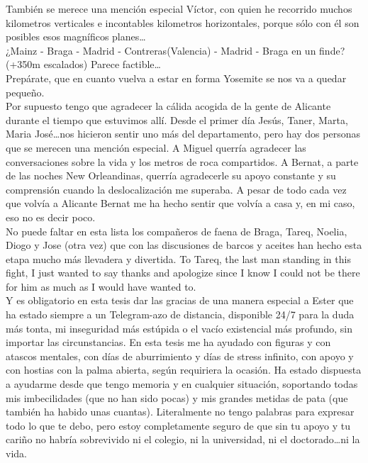 También se merece una mención especial Víctor, con quien he recorrido muchos kilometros verticales e incontables kilometros horizontales, porque sólo con él son posibles esos magníficos planes\dots\\
¿Mainz - Braga - Madrid - Contreras(Valencia) - Madrid - Braga en un finde? (+350m escalados) Parece factible\dots\\
Prepárate, que en cuanto vuelva a estar en forma Yosemite se nos va a quedar pequeño.\\


Por supuesto tengo que agradecer la cálida acogida de la gente de Alicante durante el tiempo que estuvimos allí. Desde el primer día Jesús, Taner, Marta, Maria José\dots nos hicieron sentir uno más del departamento, pero hay dos personas que se merecen una mención especial. A Miguel querría agradecer las conversaciones sobre la vida y los metros de roca compartidos. A Bernat, a parte de las noches New Orleandinas, querría agradecerle su apoyo constante y su comprensión cuando la deslocalización me superaba. A pesar de todo cada vez que volvía a Alicante Bernat me ha hecho sentir que volvía a casa y, en mi caso, eso no es decir poco.\\

No puede faltar en esta lista los compañeros de faena de Braga, Tareq, Noelia, Diogo y Jose (otra vez) que con las discusiones de barcos y aceites han hecho esta etapa mucho más llevadera y divertida. To Tareq, the last man standing in this fight, I just wanted to say thanks and apologize since I know I could not be there for him as much as I would have wanted to.\\


Y es obligatorio en esta tesis dar las gracias de una manera especial a Ester que ha estado siempre a un Telegram-azo de distancia, disponible 24/7 para la duda más tonta, mi inseguridad más estúpida o el vacío existencial más profundo, sin importar las circunstancias. En esta tesis me ha ayudado con figuras y con atascos mentales, con días de aburrimiento y días de stress infinito, con apoyo y con hostias con la palma abierta, según requiriera la ocasión.
Ha estado dispuesta a ayudarme desde que tengo memoria y en cualquier situación, soportando todas mis imbecilidades (que no han sido pocas) y mis grandes metidas de pata (que también ha habido unas cuantas).
Literalmente no tengo palabras para expresar todo lo que te debo, pero estoy completamente seguro de que sin tu apoyo y tu cariño no habría sobrevivido ni el colegio, ni la universidad, ni el doctorado\dots ni la vida.\\


